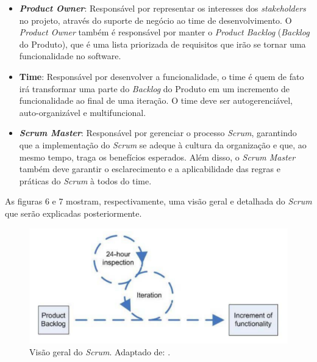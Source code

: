 \begin{itemize}
\item \textbf{\textit{Product Owner}}: Responsável por representar os interesses dos \textit{stakeholders} no projeto, através do suporte de negócio ao time de desenvolvimento. O \textit{Product Owner} também é responsável por manter o \textit{Product Backlog} (\textit{Backlog} do Produto), que é uma lista priorizada de requisitos que irão se tornar uma funcionalidade no software.

\item \textbf{Time}: Responsável por desenvolver a funcionalidade, o time é quem de fato irá transformar uma parte do \textit{Backlog} do Produto em um incremento de funcionalidade ao final de uma iteração. O time deve ser autogerenciável, auto-organizável e multifuncional.

\item \textbf{\textit{Scrum Master}}: Responsável por gerenciar o processo \textit{Scrum}, garantindo que a implementação do \textit{Scrum} se adeque à cultura da organização e que, ao mesmo tempo, traga os benefícios esperados. Além disso, o \textit{Scrum Master} também deve garantir o esclarecimento e a aplicabilidade das regras e práticas do \textit{Scrum} à todos do time.
\end{itemize}

As figuras 6 e 7 mostram, respectivamente, uma visão geral e detalhada do \textit{Scrum} que serão explicadas posteriormente.

\begin{figure}[!htb]
	\centering
		\includegraphics[scale=0.7]{figuras/scrum}
	\caption{Visão geral do \textit{Scrum}. Adaptado de: \cite{scrum2005}.}
\end{figure}


